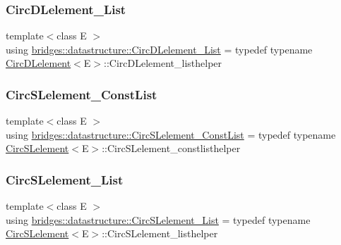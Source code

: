\subsubsection{\texorpdfstring{Circ\+D\+Lelement\+\_\+\+List}{CircDLelement\_List}}
{\footnotesize\ttfamily template$<$class E $>$ \\
using \hyperlink{namespacebridges_1_1datastructure_ab12c4e35f7131413ee6a5759273d94ac}{bridges\+::datastructure\+::\+Circ\+D\+Lelement\+\_\+\+List} = typedef typename \hyperlink{classbridges_1_1datastructure_1_1_circ_d_lelement}{Circ\+D\+Lelement}$<$E$>$\+::Circ\+D\+Lelement\+\_\+listhelper}

\mbox{\label{namespacebridges_1_1datastructure_a607154461f3493b40cb0c0b6217d97cb}} 
\subsubsection{\texorpdfstring{Circ\+S\+Lelement\+\_\+\+Const\+List}{CircSLelement\_ConstList}}
{\footnotesize\ttfamily template$<$class E $>$ \\
using \hyperlink{namespacebridges_1_1datastructure_a607154461f3493b40cb0c0b6217d97cb}{bridges\+::datastructure\+::\+Circ\+S\+Lelement\+\_\+\+Const\+List} = typedef typename \hyperlink{classbridges_1_1datastructure_1_1_circ_s_lelement}{Circ\+S\+Lelement}$<$E$>$\+::Circ\+S\+Lelement\+\_\+constlisthelper}

\mbox{\label{namespacebridges_1_1datastructure_a0369e2cdb6565569ce7fe329c66d1faf}} 
\subsubsection{\texorpdfstring{Circ\+S\+Lelement\+\_\+\+List}{CircSLelement\_List}}
{\footnotesize\ttfamily template$<$class E $>$ \\
using \hyperlink{namespacebridges_1_1datastructure_a0369e2cdb6565569ce7fe329c66d1faf}{bridges\+::datastructure\+::\+Circ\+S\+Lelement\+\_\+\+List} = typedef typename \hyperlink{classbridges_1_1datastructure_1_1_circ_s_lelement}{Circ\+S\+Lelement}$<$E$>$\+::Circ\+S\+Lelement\+\_\+listhelper}

